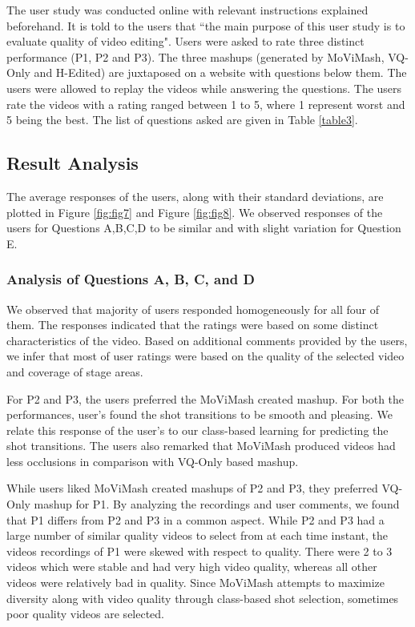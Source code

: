 \documentclass{sig-alternate}
\begin{document}
The user study was conducted online with relevant instructions
explained beforehand. It is told to the users that \textquotedblleft the main purpose of this user study is to evaluate quality of video editing". Users were asked to rate three distinct performance (P1, P2 and P3). The three mashups (generated by MoViMash, VQ-Only and H-Edited) are juxtaposed on a website with questions below them. The users were allowed to replay the videos while answering the questions. The users rate the videos with a rating ranged between 1 to 5, where 1 represent worst and 5 being the best. The list of questions asked are given in Table \ref{table3}.

\subsection{Result Analysis}
The average responses of the users, along with their standard
deviations, are plotted in Figure \ref{fig:fig7} and Figure \ref{fig:fig8}. We observed responses of the users for Questions A,B,C,D to be similar and with slight variation for Question E.

\subsubsection{Analysis of Questions A, B, C, and D}
We observed that majority of users responded homogeneously
for all four of them. The responses indicated that the ratings were based on some distinct characteristics of the video. Based on additional comments provided by the users, we infer that most of user ratings were based on the quality of the selected video and coverage of stage areas.

For P2 and P3, the users preferred the MoViMash created mashup.
For both the performances, user\textquoteright s found the shot transitions to be
smooth and pleasing. We relate this response of the user\textquoteright s to our class-based learning for predicting the shot transitions. The users also remarked that MoViMash produced videos had less occlusions in comparison with VQ-Only based mashup.

While users liked MoViMash created mashups of P2 and P3,
they preferred VQ-Only mashup for P1. By analyzing the recordings
and user comments, we found that P1 differs from P2 and P3 in
a common aspect. While P2 and P3 had a large number of similar
quality videos to select from at each time instant, the videos recordings of P1 were skewed with respect to quality. There were 2 to 3 videos which were stable and had very high video quality, whereas all other videos were relatively bad in quality. Since MoViMash attempts to maximize diversity along with video quality through class-based shot selection, sometimes poor quality videos are selected.
\end{document}
